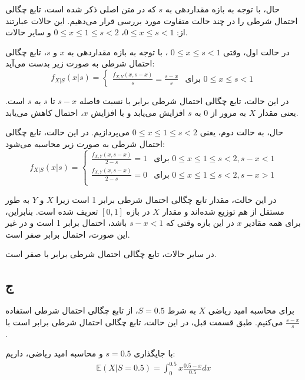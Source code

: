 حال، با توجه به بازه مقداردهی به $s$ که در متن اصلی ذکر شده است، تابع چگالی احتمال شرطی را در چند حالت متفاوت مورد بررسی قرار می‌دهیم. این حالات عبارتند از:
$0 \le x \le s < 1$، $0 \le x \le 1 \le s < 2$
و سایر حالات.

در حالت اول، وقتی 
$0 \le x \le s < 1$
، با توجه به بازه مقداردهی به $x$ و $s$، تابع چگالی احتمال شرطی به صورت زیر بدست می‌آید:
\begin{equation*}
	f_{X|S}(x | s) =
	\begin{cases}
		\frac{f_{X,Y}(x, s - x)}{s} = \frac{s - x}{s} & \text{برای } 0 \le x \le s < 1
	\end{cases}
\end{equation*}

در این حالت، تابع چگالی احتمال شرطی برابر با نسبت فاصله $s - x$ تا $s$ به $s$ است. یعنی مقدار $X$ به مرور از 0 به $s$ افزایش می‌یابد و با افزایش $x$، احتمال کاهش می‌یابد.

حال، به حالت دوم، یعنی $0 \le x \le 1 \le s < 2$ می‌پردازیم. در این حالت، تابع چگالی احتمال شرطی به صورت زیر محاسبه می‌شود:
\begin{equation*}
	f_{X|S}(x | s) =
	\begin{cases}
		\frac{f_{X,Y}(x, s - x)}{2 - s} = 1 & \text{برای } 0 \le x \le 1 \le s < 2, s - x < 1\\
		\frac{f_{X,Y}(x, s - x)}{2 - s} = 0 & \text{برای } 0 \le x \le 1 \le s < 2, s - x > 1\\
	\end{cases}
\end{equation*}

در این حالت، مقدار تابع چگالی احتمال شرطی برابر 1 است زیرا $X$ و $Y$ به طور مستقل از هم توزیع شده‌اند و مقدار $X$ در بازه $[0,1]$ تعریف شده است. بنابراین، برای همه مقادیر $x$ در این بازه وقتی که $s - x < 1$ باشد، احتمال برابر 1 است و در غیر این صورت، احتمال برابر صفر است.

در سایر حالات، تابع چگالی احتمال شرطی برابر با صفر است.

\subsection*{ج}

برای محاسبه امید ریاضی $X$ به شرط $S = 0.5$، از تابع چگالی احتمال شرطی استفاده می‌کنیم. طبق قسمت قبل، در این حالت، تابع چگالی احتمال شرطی برابر است با $\frac{s - x}{s}$.

با جایگذاری $s = 0.5$ و محاسبه امید ریاضی، داریم:
\begin{gather*}
	\mathbb{E}(X | S = 0.5) = \int_{0}^{0.5} x \frac{0.5 - x}{0.5} dx
\end{gather*}

